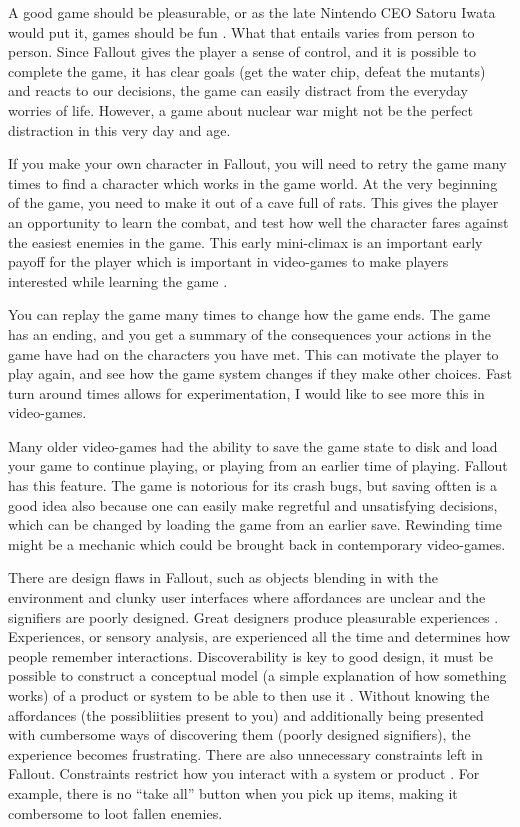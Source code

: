 A good game should be pleasurable, or as the late Nintendo CEO Satoru Iwata would put it, games should be fun \autocite{iwata}. What that entails varies from person to person. Since Fallout gives the player a sense of control, and it is possible to complete the game, it has clear goals (get the water chip, defeat the mutants) and reacts to our decisions, the game can easily distract from the everyday worries of life. However, a game about nuclear war might not be the perfect distraction in this very day and age.

If you make your own character in Fallout, you will need to retry the game many times to find a character which works in the game world. At the very beginning of the game, you need to make it out of a cave full of rats. This gives the player an opportunity to learn the combat, and test how well the character fares against the easiest enemies in the game. This early mini-climax is an important early payoff for the player which is important in video-games to make players interested while learning the game \autocite[98]{hiwiller_players_2016}.

You can replay the game many times to change how the game ends. The game has an ending, and you get a summary of the consequences your actions in the game have had on the characters you have met. This can motivate the player to play again, and see how the game system changes if they make other choices. Fast turn around times allows for experimentation, I would like to see more this in video-games.

Many older video-games had the ability to save the game state to disk and load your game to continue playing, or playing from an earlier time of playing. Fallout has this feature. The game is notorious for its crash bugs, but saving oftten is a good idea also because one can easily make regretful and unsatisfying decisions, which can be changed by loading the game from an earlier save. Rewinding time might be a mechanic which could be brought back in contemporary video-games.

There are design flaws in Fallout, such as objects blending in with the environment and clunky user interfaces where affordances are unclear and the signifiers are poorly designed. Great designers produce pleasurable experiences \autocite[9]{donald}. Experiences, or sensory analysis, are experienced all the time and determines how people remember interactions. Discoverability is key to good design, it must be possible to construct a conceptual model (a simple explanation of how something works) of a product or system to be able to then use it \autocite[24]{donald}. Without knowing the affordances (the possibliities present to you) and additionally being presented with cumbersome ways of discovering them (poorly designed signifiers), the experience becomes frustrating. There are also unnecessary constraints left in Fallout. Constraints restrict how you interact with a system or product \autocite[67]{donald}. For example, there is no ``take all'' button when you pick up items, making it combersome to loot fallen enemies.


